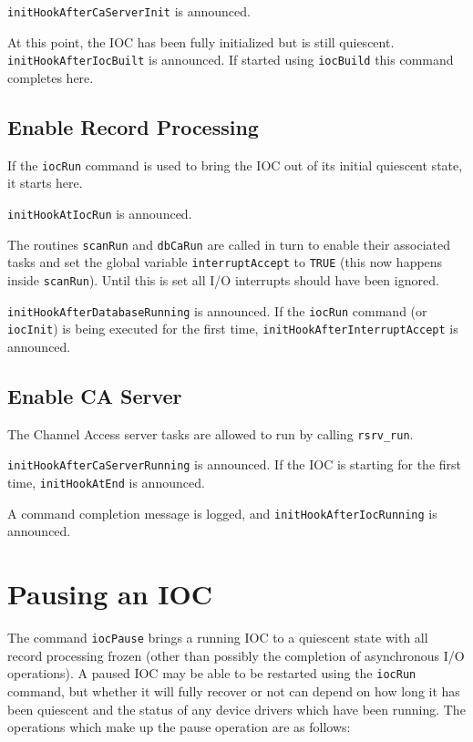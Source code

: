 \verb|initHookAfterCaServerInit| is announced.

At this point, the IOC has been fully initialized but is still quiescent. \verb|initHookAfterIocBuilt| is announced. If 
started using \verb|iocBuild| this command completes here.

\subsection{Enable Record Processing}

If the \verb|iocRun| command is used to bring the IOC out of its initial quiescent state, it starts here.

\verb|initHookAtIocRun| is announced.

The routines \verb|scanRun| and \verb|dbCaRun| are called in turn to enable their associated tasks and set the global variable 
\verb|interruptAccept| to \verb|TRUE| (this now happens inside \verb|scanRun|). Until this is set all I/O interrupts should have been 
ignored.

\verb|initHookAfterDatabaseRunning| is announced. If the \verb|iocRun| command (or \verb|iocInit|) is being executed for the 
first time, \verb|initHookAfterInterruptAccept| is announced.

\subsection{Enable CA Server}

The Channel Access server tasks are allowed to run by calling \verb|rsrv_run|.

\verb|initHookAfterCaServerRunning| is announced. If the IOC is starting for the first time, \verb|initHookAtEnd| is 
announced.

A command completion message is logged, and \verb|initHookAfterIocRunning| is announced.

\section{Pausing an IOC}

The command \verb|iocPause| brings a running IOC to a quiescent state with all record processing frozen (other than possibly 
the completion of asynchronous I/O operations).  A paused IOC may be able to be restarted using the \verb|iocRun| command, 
but whether it will fully recover or not can depend on how long it has been quiescent and the status of any device drivers 
which have been running. The operations which make up the pause operation are as follows:

